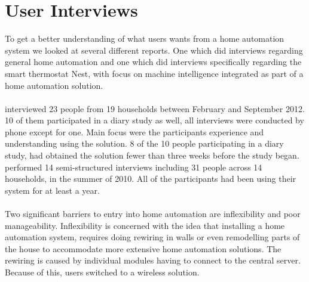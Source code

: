 \section{User Interviews}
\label{sec:interviewReports}
To get a better understanding of what users wants from a home automation system we looked at several different reports. One \cite{HAInterviews} which did interviews regarding general home automation and one which did interviews specifically regarding the smart thermostat Nest\cite{AdaptiveInterviews}, with focus on machine intelligence integrated as part of a home automation solution. 
\\\\
\cite{AdaptiveInterviews} interviewed 23 people from 19 households between February and September 2012. 10 of them participated in a diary study as well, all interviews were conducted by phone except for one. Main focus were the participants experience and understanding using the solution. 8 of the 10 people participating in a diary study, had obtained the solution fewer than three weeks before the study began. 
\cite{HAInterviews} performed 14 semi-structured interviews including 31 people across 14 households, in the summer of 2010. All of the participants had been using their system for at least a year.
\\\\
Two significant barriers to entry into home automation are inflexibility and poor manageability\cite{HAInterviews}. Inflexibility is concerned with the idea that installing a home automation system, requires doing rewiring in walls or even remodelling parts of the house to accommodate more extensive home automation solutions. The rewiring is caused by individual modules having to connect to the central server. Because of this, users switched to a wireless solution\cite{HAInterviews}.

